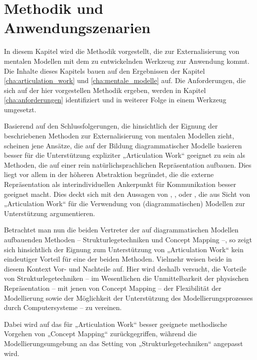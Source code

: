 
\chapter{Methodik und Anwendungszenarien} %
\label{cha:methodik}

In diesem Kapitel wird die Methodik vorgestellt, die zur Externalisierung von mentalen Modellen mit dem zu entwickelnden Werkzeug zur Anwendung kommt. Die Inhalte dieses Kapitels bauen auf den Ergebnissen der Kapitel \ref{cha:articulation_work}  und \ref{cha:mentale_modelle} auf. Die Anforderungen, die sich auf der hier vorgestellen Methodik ergeben, werden in Kapitel \ref{cha:anforderungen} identifiziert und in weiterer Folge in einem Werkzeug umgesetzt.

Basierend auf den Schlussfolgerungen, die \citet{Ifenthaler06} hinsichtlich der Eignung der beschriebenen Methoden zur Externalisierung von mentalen Modellen zieht, scheinen jene Ansätze, die auf der Bildung diagrammatischer Modelle basieren besser für die Unterstützung expliziter „Articulation Work“ geeignet zu sein als Methoden, die auf einer rein natürlichsprachlichen Repräsentation aufbauen. Dies liegt vor allem in der höheren Abstraktion begründet, die die externe Repräsentation als interindividuellen Ankerpunkt für Kommunikation besser geeignet macht. Dies deckt sich mit den Aussagen von  \citet{Sarini02}, \citet{Herrmann02}, \citet{Raposo04} oder \citet{Jorgensen04}, die aus Sicht von „Articulation Work“ für die Verwendung von (diagrammatischen) Modellen zur Unterstützung argumentieren.

Betrachtet man nun die beiden Vertreter der auf diagrammatischen Modellen aufbauenden Methoden -- Strukturlegetechniken und Concept Mapping --, so zeigt sich hinsichtlich der Eignung zum Unterstützung von „Articulation Work“ kein eindeutiger Vorteil für eine der beiden Methoden. Vielmehr weisen beide in diesem Kontext Vor- und Nachteile auf. Hier wird deshalb versucht, die Vorteile von Strukturlegetechniken -- im Wesentlichen die Unmittelbarkeit der physischen Repräsentation -- mit jenen von Concept Mapping -- der Flexibilität der Modellierung sowie der Möglichkeit der Unterstützung des Modellierungsprozesses durch Computersysteme -- zu vereinen.

Dabei wird auf das für „Articulation Work“ besser geeignete methodische Vorgehen von „Concept Mapping“ zurückgegriffen, während die Modellierungsumgebung an das Setting von „Strukturlegetechniken“ angepasst wird.

